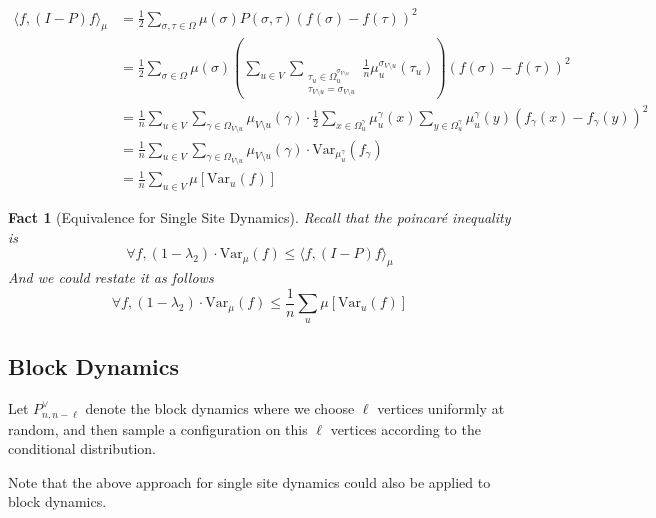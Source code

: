 \documentclass{article}
\newtheorem{fact}{Fact}[section]
\def\<{\langle}
\def\>{\rangle}
\def\Var{\mathrm{Var}}
\begin{document}
\begin{align*}
  \<f, (I - P)f\>_\mu
  &= \frac{1}{2} \sum_{\sigma, \tau \in\Omega} \mu(\sigma)P(\sigma, \tau)\left(f(\sigma) - f(\tau)\right)^2 \\
  &= \frac{1}{2} \sum_{\sigma\in\Omega} \mu(\sigma) \left(\sum_{u\in V} \sum_{\substack{\tau_u\in\Omega^{\sigma_{V\setminus u}}_u \\ \tau_{V\setminus u} = \sigma_{V\setminus u}}} \frac{1}{n} \mu^{\sigma_{V\setminus u}}_u(\tau_u)\right)\left(f(\sigma) - f(\tau)\right)^2 \\
  &= \frac{1}{n} \sum_{u\in V} \sum_{\gamma\in \Omega_{V\setminus u}} \mu_{V\setminus u} (\gamma) \cdot \frac{1}{2} \sum_{x\in \Omega^{\gamma}_u} \mu^\gamma_u(x) \sum_{y\in\Omega^\gamma_u}\mu^\gamma_u(y) (f_\gamma(x) - f_\gamma(y))^2 \\
  &= \frac{1}{n}\sum_{u\in V} \sum_{\gamma\in\Omega_{V\setminus u}} \mu_{V\setminus u}(\gamma) \cdot \Var_{\mu^\gamma_u} (f_\gamma) \\
  &= \frac{1}{n} \sum_{u\in V} \mu\left[\Var_u(f)\right]
\end{align*}

\begin{fact}[Equivalence for Single Site Dynamics]
  Recall that the poincar{\'e} inequality is
  \[\forall f, (1 - \lambda_2) \cdot \Var_\mu (f) \leq \<f, (I - P)f\>_\mu\]
  And we could restate it as follows
  \[\forall f, (1 - \lambda_2) \cdot \Var_\mu (f) \leq \frac{1}{n}\sum_{u} \mu [\Var_u (f)]\]
\end{fact}

\subsection{Block  Dynamics}
Let $P^\lor_{n, n - \ell}$ denote the block dynamics where we choose $\ell$ vertices uniformly at random, and then sample a configuration on this $\ell$ vertices according to the conditional distribution.

Note that the above approach for single site dynamics could also be applied to block dynamics.
\end{document}
